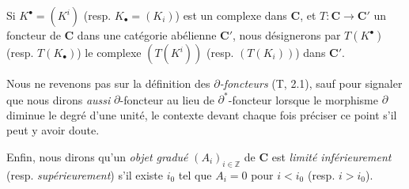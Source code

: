 \begin{env}[11.2.1]
Si $K^\bullet=(K^i)$ (resp. $K_\bullet=(K_i)$) est un complexe dans
$\boldsymbol{C}$, et $T:\boldsymbol{C}\to\boldsymbol{C}'$ un foncteur de $\boldsymbol{C}$
dans une catégorie abélienne $\boldsymbol{C}'$, nous désignerons par
$T(K^\bullet)$ (resp. $T(K_\bullet)$) le complexe $(T(K^i))$ (resp.
$(T(K_i))$) dans $\boldsymbol{C}'$.

Nous ne revenons pas sur la définition des \emph{$\partial$-foncteurs} (T, 2.1),
sauf pour signaler que nous dirons \emph{aussi} $\partial$-foncteur au lieu de
$\partial^*$-foncteur lorsque le morphisme $\partial$ diminue le degré d'une
unité, le contexte devant chaque fois préciser ce point s'il peut y avoir
doute.

Enfin, nous dirons qu'un \emph{objet gradué} $(A_i)_{i\in\mathbb Z}$ de
$\boldsymbol{C}$ est \emph{limité inférieurement} (resp. \emph{supérieurement})
s'il existe $i_0$ tel que $A_i=0$ pour $i<i_0$ (resp. $i>i_0$).
\end{env}

